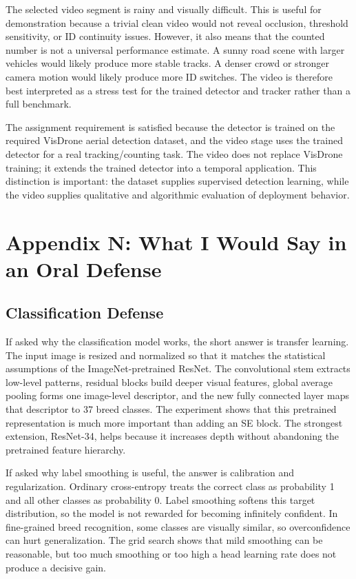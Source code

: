 \documentclass[10pt,twocolumn]{article}
\begin{document}
The selected video segment is rainy and visually difficult. This is useful for demonstration because a trivial clean video would not reveal occlusion, threshold sensitivity, or ID continuity issues. However, it also means that the counted number is not a universal performance estimate. A sunny road scene with larger vehicles would likely produce more stable tracks. A denser crowd or stronger camera motion would likely produce more ID switches. The video is therefore best interpreted as a stress test for the trained detector and tracker rather than a full benchmark.

The assignment requirement is satisfied because the detector is trained on the required VisDrone aerial detection dataset, and the video stage uses the trained detector for a real tracking/counting task. The video does not replace VisDrone training; it extends the trained detector into a temporal application. This distinction is important: the dataset supplies supervised detection learning, while the video supplies qualitative and algorithmic evaluation of deployment behavior.

\section{Appendix N: What I Would Say in an Oral Defense}

\subsection{Classification Defense}

If asked why the classification model works, the short answer is transfer learning. The input image is resized and normalized so that it matches the statistical assumptions of the ImageNet-pretrained ResNet. The convolutional stem extracts low-level patterns, residual blocks build deeper visual features, global average pooling forms one image-level descriptor, and the new fully connected layer maps that descriptor to 37 breed classes. The experiment shows that this pretrained representation is much more important than adding an SE block. The strongest extension, ResNet-34, helps because it increases depth without abandoning the pretrained feature hierarchy.

If asked why label smoothing is useful, the answer is calibration and regularization. Ordinary cross-entropy treats the correct class as probability 1 and all other classes as probability 0. Label smoothing softens this target distribution, so the model is not rewarded for becoming infinitely confident. In fine-grained breed recognition, some classes are visually similar, so overconfidence can hurt generalization. The grid search shows that mild smoothing can be reasonable, but too much smoothing or too high a head learning rate does not produce a decisive gain.
\end{document}

